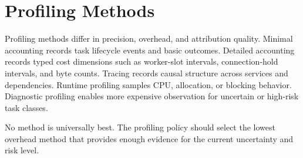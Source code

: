 \section{Profiling Methods}
\label{sec:profiling-methods}

Profiling methods differ in precision, overhead, and attribution quality.
Minimal accounting records task lifecycle events and basic outcomes. Detailed
accounting records typed cost dimensions such as worker-slot intervals,
connection-hold intervals, and byte counts. Tracing records causal structure
across services and dependencies. Runtime profiling samples CPU, allocation, or
blocking behavior. Diagnostic profiling enables more expensive observation for
uncertain or high-risk task classes.

No method is universally best. The profiling policy should select the lowest
overhead method that provides enough evidence for the current uncertainty and
risk level.
